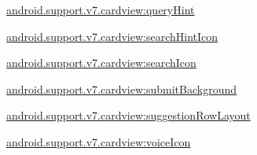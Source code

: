 {\ttfamily \hyperlink{classandroid_1_1support_1_1v7_1_1cardview_1_1R_1_1styleable_a8a00434d6e5e7c5f1d6407571e139641}{android.\+support.\+v7.\+cardview\+:query\+Hint}}

{\ttfamily \hyperlink{classandroid_1_1support_1_1v7_1_1cardview_1_1R_1_1styleable_a6f8fc657ddfa535ada1e5e37d0a4c369}{android.\+support.\+v7.\+cardview\+:search\+Hint\+Icon}}

{\ttfamily \hyperlink{classandroid_1_1support_1_1v7_1_1cardview_1_1R_1_1styleable_a1e912bff6dbc1cd9b21249197e9e3d89}{android.\+support.\+v7.\+cardview\+:search\+Icon}}

{\ttfamily \hyperlink{classandroid_1_1support_1_1v7_1_1cardview_1_1R_1_1styleable_a7d4e946a7b0ee85b63f28d0ee6b9afde}{android.\+support.\+v7.\+cardview\+:submit\+Background}}

{\ttfamily \hyperlink{classandroid_1_1support_1_1v7_1_1cardview_1_1R_1_1styleable_a97ae2d4d4adca4dd298ad724f0819aac}{android.\+support.\+v7.\+cardview\+:suggestion\+Row\+Layout}}

{\ttfamily \hyperlink{classandroid_1_1support_1_1v7_1_1cardview_1_1R_1_1styleable_af547d6c74440f698844627ab90d35a40}{android.\+support.\+v7.\+cardview\+:voice\+Icon}}

